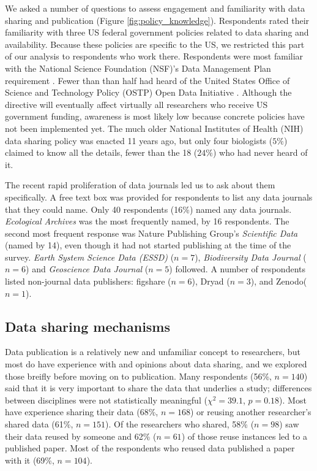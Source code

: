 \documentclass[10pt]{article}
\begin{document}
We asked a number of questions to assess engagement and familiarity with data sharing and publication (Figure \ref{fig:policy_knowledge}).
Respondents rated their familiarity with three US federal government policies related to data sharing and availability.
Because these policies are specific to the US, we restricted this part of our analysis to respondents who work there.
Respondents were most familiar with the National Science Foundation (NSF)'s Data Management Plan requirement \cite{national_science_foundation_gpg_2011}.
Fewer than than half had heard of the United States Office of Science and Technology Policy (OSTP) Open Data Initiative \cite{obama_making_2013}. 
Although the directive will eventually affect virtually all researchers who receive US government funding, awareness is most likely low because concrete policies have not been implemented yet. 
The much older National Institutes of Health (NIH) data sharing policy \cite{national_institutes_of_health_final_2003} was enacted 11 years ago, but only four biologists ($5\%$) claimed to know all the details, fewer than the 18 ($24\%$) who had never heard of it.

The recent rapid proliferation of data journals led us to ask about them specifically.
A free text box was provided for respondents to list any data journals that they could name.
Only 40 respondents (16\%) named any data journals. 
\emph{Ecological Archives} was the most frequently named, by 16 respondents. 
The second most frequent response was Nature Publishing Group's \emph{Scientific Data} (named by 14), even though it had not started publishing at the time of the survey.
\emph{Earth System Science Data (ESSD)} ($n=7$), \emph{Biodiversity Data Journal} ($n=6$) and \emph{Geoscience Data Journal} ($n=5$) followed.
A number of respondents listed non-journal data publishers: figshare ($n=6$), Dryad ($n=3$), and Zenodo($n=1$).

\subsection*{Data sharing mechanisms}

Data publication is a relatively new and unfamiliar concept to researchers, but most do have experience with and opinions about data sharing, and we explored those breifly before moving on to publication.
Many respondents (56\%, $n=140$) said that it is very important to share the data that underlies a study; differences between disciplines were not statistically meaningful ($\chi^{2}=39.1$, $p= 0.18$).
Most have experience sharing their data (68\%, $n=168$) or reusing another researcher's shared data (61\%, $n=151$).
Of the researchers who shared, 58\% ($n=98$) saw their data reused by someone and 62\% ($n=61$) of those reuse instances led to a published paper.
Most of the respondents who reused data published a paper with it (69\%, $n=104$).
\end{document}
